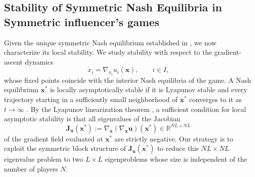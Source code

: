 \documentclass{article}
\begin{document}
        \subsection{Stability of Symmetric Nash Equilibria in Symmetric influencer's games}
            Given the unique symmetric Nash equilibrium established in , we now characterize its local stability. We study stability with respect to the gradient-ascent dynamics
            \begin{equation}
                \dot{x}_i = \nabla_{x_i}u_i(\mathbf{x}), \qquad i \in I,
            \end{equation}
            whose fixed points coincide with the interior Nash equilibria of the game. A Nash equilibrium $\mathbf{x}^*$ is locally asymptotically stable if it is Lyapunov stable and every trajectory starting in a sufficiently small neighborhood of $\mathbf{x}^*$ converges to it as $t\to\infty$ \cite[§8.4]{hirsch2013differential}. By the Lyapunov linearization theorem \cite[Thm.~1 §8.4]{hirsch2013differential}, a sufficient condition for local asymptotic stability is that all eigenvalues of the Jacobian
            \begin{equation}
                \mathbf{J}_{\mathbf{u}}(\mathbf{x}^*) := \nabla_{\mathbf{x}}(\nabla_{\mathbf{x}}\mathbf{u})(\mathbf{x}^*)\in\mathbb{R}^{NL\times NL}
            \end{equation}
            of the gradient field evaluated at $\mathbf{x}^*$ are strictly negative. Our strategy is to exploit the symmetric block structure of $\mathbf{J}_{\mathbf{u}}(\mathbf{x}^*)$ to reduce this $NL\times NL$ eigenvalue problem to two $L\times L$ eigenproblems whose size is independent of the number of players $N$.
\end{document}
